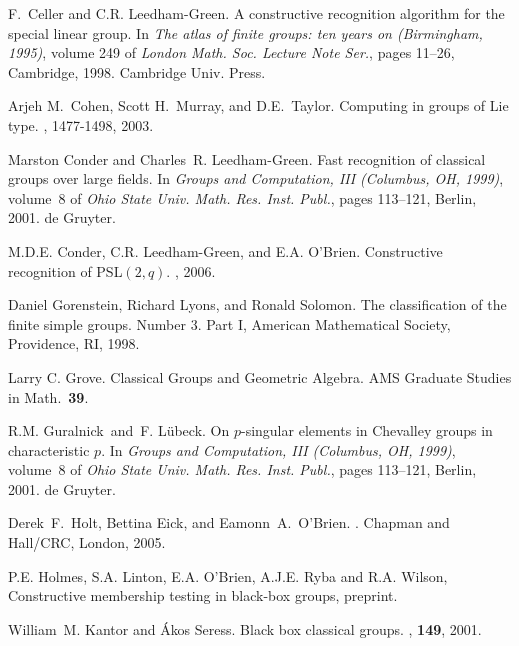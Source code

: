 \documentclass[12pt]{article}
\begin{document}
\begin{thebibliography}{10000}
F.~Celler and C.R. Leedham-Green.
\newblock A constructive recognition algorithm for the special linear group.
\newblock In {\em The atlas of finite groups: ten years on (Birmingham, 1995)},
  volume 249 of {\em London Math. Soc. Lecture Note Ser.}, pages 11--26,
  Cambridge, 1998. Cambridge Univ. Press.



Arjeh M.\ Cohen, Scott H.\ Murray, and D.E.\ Taylor.
\newblock Computing in groups of Lie type.
, 1477-1498, 2003.

Marston Conder and Charles~R. Leedham-Green.
\newblock Fast recognition of classical groups over large fields.
\newblock In {\em Groups and Computation, III (Columbus, OH, 1999)}, volume~8
  of {\em Ohio State Univ. Math. Res. Inst. Publ.}, pages 113--121, Berlin,
  2001. de Gruyter.

M.D.E. Conder, C.R. Leedham-Green, and E.A. O'Brien.
\newblock Constructive recognition of PSL$(2, q)$.
, 2006.

Daniel Gorenstein, Richard Lyons, and  Ronald Solomon.
The classification of the finite simple groups. Number 3. Part I,
American Mathematical Society, Providence, RI, 1998. 

Larry C. Grove. Classical Groups and Geometric Algebra.
AMS Graduate Studies in Math.\ {\bf 39}.

R.M. Guralnick\ and\ F. L\"ubeck.
 On $p$-singular elements in Chevalley groups in characteristic $p$.
\newblock In {\em Groups and Computation, III (Columbus, OH, 1999)}, volume~8
  of {\em Ohio State Univ. Math. Res. Inst. Publ.}, pages 113--121,
Berlin, 2001. de Gruyter.

Derek~F.\ Holt, Bettina Eick, and Eamonn~A.\ O'Brien.
.
\newblock Chapman and Hall/CRC, London, 2005.

 P.E. Holmes, S.A. Linton, E.A. O'Brien, A.J.E. Ryba and
R.A. Wilson, Constructive membership testing in black-box
groups, preprint.

William~M. Kantor and {\'A}kos Seress.
\newblock Black box classical groups.
, {\bf 149}, 2001.
                             
                                                                                

\end{thebibliography}
\end{document}

